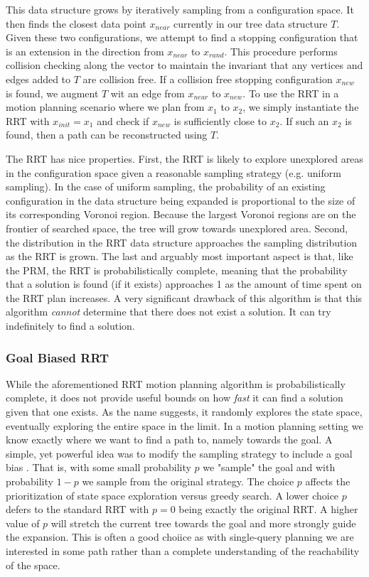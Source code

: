 This data structure grows by iteratively sampling from a configuration space. It then finds the closest data point $x_{near}$ currently in our tree data structure $T$. Given these two configurations, we attempt to find a stopping configuration that is an extension in the direction from $x_{near}$ to $x_{rand}$. This procedure performs collision checking along the vector to maintain the invariant that any vertices and edges added to $T$ are collision free. If a collision free stopping configuration $x_{new}$ is found, we augment $T$ wit an edge from $x_{near}$ to $x_{new}$. To use the RRT in a motion planning scenario where we plan from $x_1$ to $x_2$, we simply instantiate the RRT with $x_{init} = x_1$ and check if $x_{new}$ is sufficiently close to $x_2$. If such an $x_2$ is found, then a path can be reconstructed using $T$.

The RRT has nice properties. First, the RRT is likely to explore unexplored areas in the configuration space given a reasonable sampling strategy (e.g. uniform sampling). In the case of uniform sampling, the probability of an existing configuration in the data structure being expanded is proportional to the size of its corresponding Voronoi region. Because the largest Voronoi regions are on the frontier of searched space, the tree will grow towards unexplored area. Second, the distribution in the RRT data structure approaches the sampling distribution as the RRT is grown. The last and arguably most important aspect is that, like the PRM, the RRT is probabilistically complete, meaning that the probability that a solution is found (if it exists) approaches 1 as the amount of time spent on the RRT plan increases. A very significant drawback of this algorithm is that this algorithm \emph{cannot} determine that there does not exist a solution. It can try indefinitely to find a solution.

\subsubsection{Goal Biased RRT} \label{planning:goal-bias}
While the aforementioned RRT motion planning algorithm is probabilistically complete, it does not provide useful bounds on how \emph{fast} it can find a solution given that one exists. As the name suggests, it randomly explores the state space, eventually exploring the entire space in the limit. In a motion planning setting we know exactly where we want to find a path to, namely towards the goal. A simple, yet powerful idea was to modify the sampling strategy to include a goal bias \cite{lavalle:rrt}. That is, with some small probability $p$ we "sample" the goal and with probability $1-p$ we sample from the original strategy. The choice $p$ affects the prioritization of state space exploration versus greedy search. A lower choice $p$ defers to the standard RRT with $p=0$ being exactly the original RRT. A higher value of $p$ will stretch the current tree towards the goal and more strongly guide the expansion. This is often a good choiice as with single-query planning we are interested in some path rather than a complete understanding of the reachability of the space.


